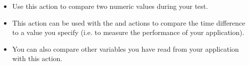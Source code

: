 
\begin{itemize}
\item Use this action to compare two numeric values during your test.
\item This action can be used with the  and  actions to compare the time difference to a value you specify (i.e. to measure the performance of your application). 
\item You can also compare other variables you have read from your application with this action. 
\end{itemize}
